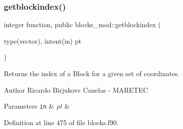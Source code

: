 \mbox{\label{namespaceblocks__mod_a62e8fb0d6b2535b4499c7a4d848c24ba}} 
\subsubsection{\texorpdfstring{getblockindex()}{getblockindex()}}
{\footnotesize\ttfamily integer function, public blocks\+\_\+mod\+::getblockindex (\begin{DoxyParamCaption}\item[{type(vector), intent(in)}]{pt }\end{DoxyParamCaption})}



Returns the index of a Block for a given set of coordinates. 

\begin{DoxyAuthor}{Author}
Ricardo Birjukovs Canelas -\/ M\+A\+R\+E\+T\+EC 
\end{DoxyAuthor}

\begin{DoxyParams}[1]{Parameters}
\mbox{\tt in}  & {\em pt} & \\
\hline
\end{DoxyParams}


Definition at line 475 of file blocks.\+f90.


